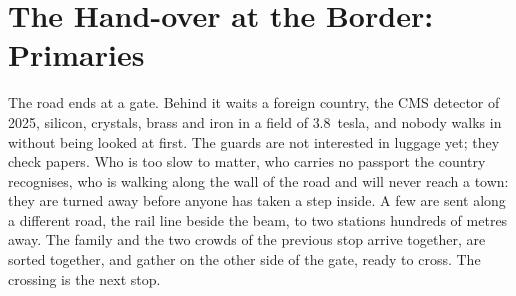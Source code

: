 \providecommand{\akfour}{\code{ak4GenJets}\xspace}
\providecommand{\akfournonu}{\code{ak4GenJetsNoNu}\xspace}
\providecommand{\MeV}{\ensuremath{\,\mathrm{MeV}}\xspace}
\providecommand{\cm}{\ensuremath{\,\mathrm{cm}}\xspace}
\providecommand{\um}{\ensuremath{\,\mu\mathrm{m}}\xspace}
\providecommand{\ns}{\ensuremath{\,\mathrm{ns}}\xspace}
\providecommand{\Zmax}{\ensuremath{Z_{\max}}\xspace}
\providecommand{\Zhec}{\ensuremath{Z_{\mathrm{H}}}\xspace}
\providecommand{\rhoPU}{\ensuremath{\rho}\xspace}

\chapter{The Hand-over at the Border: \GEANT Primaries}
\label{ch:crossing_the_border}

\begin{journeybox}
The road ends at a gate. Behind it waits a foreign country, the CMS
detector of 2025, silicon, crystals, brass and iron in a field of
$3.8$~tesla, and nobody walks in without being looked at first. The guards
are not interested in luggage yet; they check papers. Who is too slow to
matter, who carries no passport the country recognises, who is walking
along the wall of the road and will never reach a town: they are turned
away before anyone has taken a step inside. A few are sent along a
different road, the rail line beside the beam, to two stations hundreds of
metres away. The family and the two crowds of the previous stop arrive
together, are sorted together, and gather on the other side of the gate,
ready to cross. The crossing is the next stop.
\end{journeybox}

